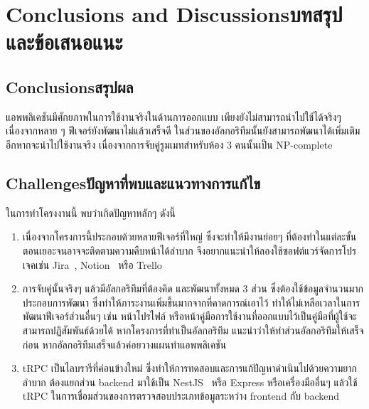 \chapter{\ifenglish Conclusions and Discussions\else บทสรุปและข้อเสนอแนะ\fi}

\section{\ifenglish Conclusions\else สรุปผล\fi}

แอพพลิเคชันมีศักยภาพในการใช้งานจริงในด้านการออกแบบ เพียงยังไม่สามารถนำไปใช้ได้จริงๆ เนื่องจากหลาย ๆ ฟีเจอร์ยังพัฒนาไม่แล้วเสร็จดี
ในส่วนของอัลกอริทึมนั้นยังสามารถพัฒนาได้เพิ่มเติมอีกหากจะนำไปใช้งานจริง เนื่องจากการจับคู่รูมเมทสำหรับห้อง 3 คนนั้นเป็น
NP-complete

\section{\ifenglish Challenges\else ปัญหาที่พบและแนวทางการแก้ไข\fi}

ในการทำโครงงานนี้ พบว่าเกิดปัญหาหลักๆ ดังนี้
\begin{enumerate}
  \item เนื่องจากโครงการนี้ประกอบด้วยหลายฟีเจอร์ที่ใหญ่ ซึ่งจะทำให้มีงานย่อยๆ ที่ต้องทำในแต่ละขั้นตอนเยอะจนอาจจะติดตามความคืบหน้าได้ลำบาก
        จึงอยากแนะนำให้ลองใช้ซอฟต์แวร์จัดการโปรเจคเช่น Jira~\cite{Jira-wiki}, Notion~\cite{Notion-wiki} 
        หรือ Trello~\cite{Trello-wiki}
  \item การจับคู่นั้นจริงๆ แล้วมีอัลกอริทึมที่ต้องคิด และพัฒนาทั้งหมด 3 ส่วน ซึ่งต้องใช้ข้อมูลจำนวนมากประกอบการพัฒนา
        ซึ่งทำให้ภาระงานเพิ่มขึ้นมากจากที่คาดการณ์เอาไว้ ทำให้ไม่เหลือเวลาในการพัฒนาฟีเจอร์ส่วนอื่นๆ เช่น หน้าโปรไฟล์ 
        หรือหน้าคู่มือการใช้งานที่ออกแบบไว้เป็นคู่มือที่ผู้ใช้จะสามารถปฏิสัมพันธ์ด้วยได้ หากโครงการที่ทำเป็นอัลกอริทึม แนะนำว่าให้ทำส่วนอัลกอริทึมให้เสร็จก่อน
        หากอัลกอริทึมเสร็จแล้วค่อยวางแผนทำแอพพลิเคชัน
  \item tRPC เป็นไลบรารีที่ค่อนข้างใหม่ ซึ่งทำให้การทดสอบและการแก้ปัญหาดำเนินไปด้วยความยากลำบาก ต้องแยกส่วน backend มาใช้เป็น 
        NestJS~\cite{whatNestJS} หรือ Express หรือเครื่องมืออื่นๆ แล้วใช้ tRPC ในการเชื่อมส่วนของการตรวจสอบประเภทข้อมูลระหว่าง frontend กับ backend
\end{enumerate}


